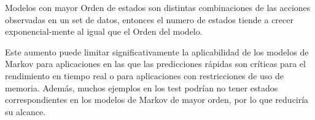 Modelos con mayor Orden de estados son distintas combinaciones de las acciones observadas en un set de datos, entonces el numero de estados tiende a crecer exponencial-mente al igual que el Orden del modelo.

Este aumento puede limitar significativamente la aplicabilidad de los modelos de Markov para aplicaciones en las que las predicciones rápidas son críticas para el rendimiento en tiempo real o para aplicaciones con restricciones de uso de memoria. Además, muchos ejemplos en los test podrían no tener estados correspondientes en los modelos de Markov de mayor orden, por lo que reduciría su alcance.
 
 

\nocite{*}
